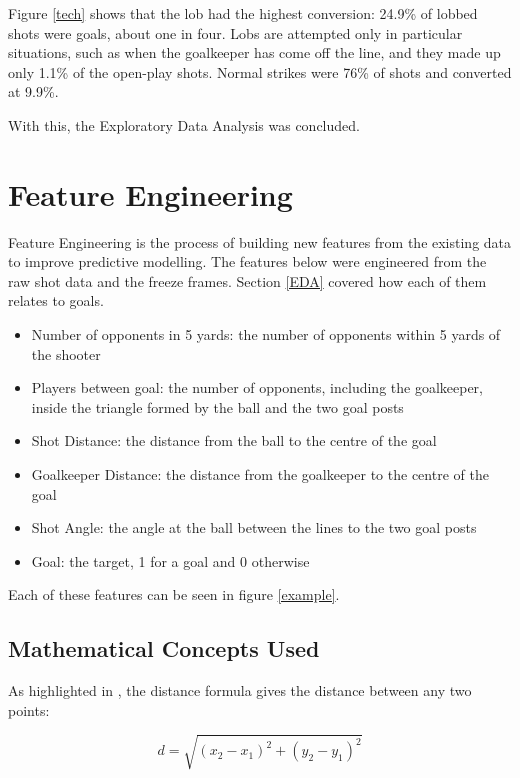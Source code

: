 Figure \ref{tech} shows that the lob had the highest conversion: 24.9\% of lobbed shots were goals, about one in four. Lobs are attempted only in particular situations, such as when the goalkeeper has come off the line, and they made up only 1.1\% of the open-play shots. Normal strikes were 76\% of shots and converted at 9.9\%.

With this, the Exploratory Data Analysis was concluded.

\newpage

\section{Feature Engineering}\label{feature}

Feature Engineering is the process of building new features from the existing data to improve predictive modelling. The features below were engineered from the raw shot data and the freeze frames. Section \ref{EDA} covered how each of them relates to goals.

\begin{itemize}
    \item Number of opponents in 5 yards: the number of opponents within 5 yards of the shooter
    \item Players between goal: the number of opponents, including the goalkeeper, inside the triangle formed by the ball and the two goal posts
    \item Shot Distance: the distance from the ball to the centre of the goal
    \item Goalkeeper Distance: the distance from the goalkeeper to the centre of the goal
    \item Shot Angle: the angle at the ball between the lines to the two goal posts
    \item Goal: the target, 1 for a goal and 0 otherwise
\end{itemize}

Each of these features can be seen in figure \ref{example}.

\newpage

\subsection{Mathematical Concepts Used}

As highlighted in \cite{maor2019pythagorean}, the distance formula gives the distance between any two points:

\begin{equation}
d = \sqrt{(x_2-x_1)^2 + (y_2-y_1)^2}
\label{distance}
\end{equation}

